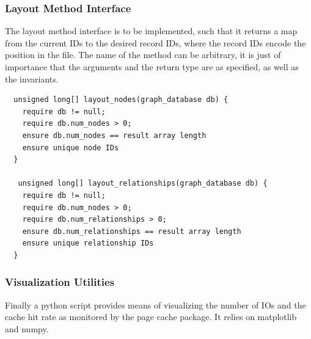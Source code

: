     \subsubsection{Layout Method Interface} 
    The layout method interface is to be implemented, such that it returns a map from the current IDs to the desired record IDs, where the record IDs encode the position in the file. The name of the method can be arbitrary, it is just of importance that the arguments and the return type are as specified, as well as the invariants.
    \begin{verbatim}
  unsigned long[] layout_nodes(graph_database db) {
    require db != null;
    require db.num_nodes > 0;
    ensure db.num_nodes == result array length
    ensure unique node IDs
  }
  
   unsigned long[] layout_relationships(graph_database db) {
    require db != null;
    require db.num_nodes > 0;
    require db.num_relationships > 0;
    ensure db.num_relationships == result array length
    ensure unique relationship IDs
  }
\end{verbatim}

\subsubsection{Visualization Utilities}
Finally a python script provides means of visualizing the number of IOs and the cache hit rate as monitored by the page cache package. It relies on matplotlib and numpy.
